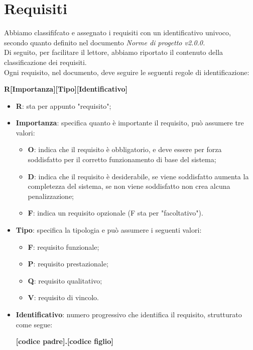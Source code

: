 \section{Requisiti}\label{Requisiti}

Abbiamo classififcato e assegnato i requisiti con un identificativo univoco, secondo quanto definito nel documento \textit{Norme di progetto v2.0.0.}
\\
Di seguito, per facilitare il lettore, abbiamo riportato il contenuto della classificazione dei requisiti.
\\
Ogni requisito, nel documento, deve seguire le seguenti regole di identificazione:
\begin{center}
	\textbf{R[Importanza][Tipo][Identificativo]}
\end{center}  
\begin{itemize}
	\item \textbf{R}: sta per appunto "requisito";
	\item \textbf{Importanza}: specifica quanto è importante il requisito, può assumere tre valori:
	\begin{itemize}
		\item \textbf{O}: indica che il requisito è obbligatorio, e deve essere per forza soddisfatto per il corretto funzionamento di base del sistema;
		\item \textbf{D}: indica che il requisito è desiderabile, se viene soddisfatto aumenta la completezza del sistema, se non viene soddisfatto non crea alcuna penalizzazione;
		\item \textbf{F}: indica un requisito opzionale (F sta per "facoltativo"). 
	\end{itemize}
	\item \textbf{Tipo}: specifica la tipologia e può assumere i seguenti valori:
	\begin{itemize}
		\item \textbf{F}: requisito funzionale;
		\item \textbf{P}: requisito prestazionale;
		\item \textbf{Q}: requisito qualitativo;
		\item \textbf{V}: requisito di vincolo.
	\end{itemize}
	\item \textbf{Identificativo}: numero progressivo che identifica il requisito, strutturato come segue: 
	\begin{center}
		\textbf{[codice padre].[codice figlio]}	
	\end{center}
\end{itemize}

